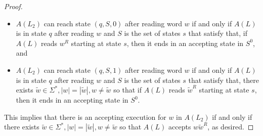 \begin{proof}
\begin{itemize}
    \item  $A(L_2)$ can reach state $(q, S, 0)$ after reading word $w$ if and only if
    $A(L)$ is in state $q$ after reading $w$ and $S$ is the set of states $s$ that satisfy that, if $A(L)$ reads $w^R$ starting at state $s$,
    then it ends in an accepting state in $S^0$, and
    \item $A(L_2)$ can reach state $(q, S, 1)$ after reading word $w$ if and only if
    $A(L)$ is in state $q$ after reading $w$ and $S$ is the set of states $s$ that satisfy that, 
    there exists $\tilde{w} \in \Sigma^*, |w| = |\tilde{w}|, w \neq \tilde{w}$ so that if $A(L)$ reads $\tilde{w}^R$ starting at state $s$,
    then it ends in an accepting state in $S^0$.
\end{itemize}

This implies that there is an accepting execution for $w$ in $A(L_2)$ if and only if there exists
$\tilde{w} \in \Sigma^*, |w| = |\tilde{w}|, w \neq \tilde{w}$ so that $A(L)$ accepts $w\tilde{w}^R$, as desired. 


\end{proof}



